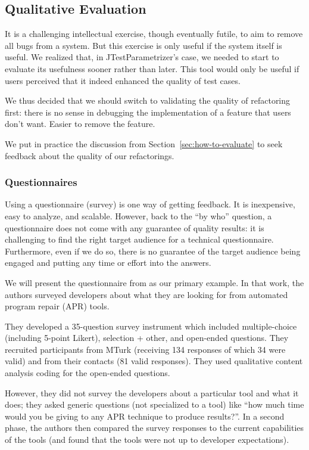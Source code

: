 \subsection{Qualitative Evaluation}
It is a challenging intellectual exercise, though eventually futile,
to aim to remove all bugs from a system. But this exercise is only useful
if the system itself is useful. We realized that, in JTestParametrizer's
case, we needed to start to evaluate its usefulness sooner rather than later.
This tool would only be useful if users perceived that it indeed enhanced the
quality of test cases.

We thus decided that we should switch to validating the quality of
refactoring first: there is no sense in debugging the implementation of a feature
that users don't want. Easier to remove the feature.

We put in practice the discussion  from Section~\ref{sec:how-to-evaluate}
to seek feedback about the quality of our refactorings.

\subsubsection{Questionnaires}
Using a questionnaire (survey) is one way of getting feedback. It is
inexpensive, easy to analyze, and scalable. However, back to the
``by who'' question, a questionnaire does not come with any
guarantee of quality results: it is challenging to find the right
target audience for a technical questionnaire. Furthermore, even if we
do so, there is no guarantee of the target audience being
engaged and putting any time or effort into the answers.

We will present the questionnaire from
\cite{noller22:_trust_enhan_issues_progr_repair} as our primary
example. In that work, the authors surveyed developers about what they
are looking for from automated program repair (APR) tools.

They developed a
35-question survey instrument which included multiple-choice
(including 5-point Likert), selection + other, and open-ended
questions. They recruited participants from MTurk (receiving 134
responses of which 34 were valid) and from their contacts (81 valid
responses). They used qualitative content analysis coding for the open-ended
questions. 

However, they did not survey the developers about a particular tool
and what it does; they asked generic questions (not specialized to a
tool) like ``how much time would you be giving to any APR technique to
produce results?''. In a second phase, the authors then compared the
survey responses to the current capabilities of the tools (and found
that the tools were not up to developer expectations).


